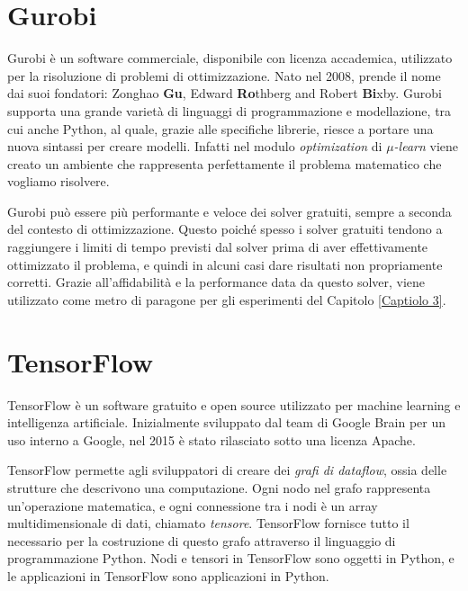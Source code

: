 \documentclass[a4paper,12pt]{report}
\begin{document}
\section{Gurobi}
Gurobi \cite{gurobi} è un software commerciale, disponibile con licenza accademica, utilizzato per la risoluzione di problemi di ottimizzazione. Nato nel 2008, prende il nome dai suoi fondatori: Zonghao \textbf{Gu}, Edward \textbf{Ro}thberg and Robert \textbf{Bi}xby. Gurobi supporta una grande varietà di linguaggi di programmazione e modellazione, tra cui anche Python, al quale, grazie alle specifiche librerie, riesce a portare una nuova sintassi per creare modelli.
Infatti nel modulo \textit{optimization} di \textit{$\mu$-learn} \cite{mulearn_documentation} viene creato un ambiente che rappresenta perfettamente il problema matematico che vogliamo risolvere.

\noindent Gurobi può essere più performante e veloce dei solver gratuiti, sempre a seconda del contesto di ottimizzazione. Questo poiché spesso i solver gratuiti tendono a raggiungere i limiti di tempo previsti dal solver prima di aver effettivamente ottimizzato il problema, e quindi in alcuni casi dare risultati non propriamente corretti. Grazie all'affidabilità e la performance data da questo solver, viene utilizzato come metro di paragone per gli esperimenti del Capitolo \ref{Captiolo 3}.

\section{TensorFlow} %
TensorFlow \cite{tensorflow2015-whitepaper} è un software gratuito e open source utilizzato per machine learning e intelligenza artificiale. Inizialmente sviluppato dal team di Google Brain per un uso interno a Google, nel 2015 è stato rilasciato sotto una licenza Apache.

\noindent TensorFlow permette agli sviluppatori di creare dei \textit{grafi di dataflow}, ossia delle strutture che descrivono una computazione. Ogni nodo nel grafo rappresenta un'operazione matematica, e ogni connessione tra i nodi è un array multidimensionale di dati, chiamato \textit{tensore}. TensorFlow fornisce tutto il necessario per la costruzione di questo grafo attraverso il linguaggio di programmazione Python. Nodi e tensori in TensorFlow sono oggetti in Python, e le applicazioni in TensorFlow sono applicazioni in Python.
\end{document}
